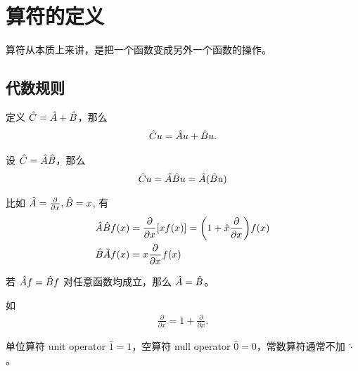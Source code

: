 
\section{算符的定义}
算符从本质上来讲，是把一个函数变成另外一个函数的操作。
\subsection{代数规则}

\begin{theorem}[算符的和与差]
    定义 $\hat C = \hat A + \hat B$，那么
\begin{eqnarray}
    \hat C u = \hat A u + \hat B u. 
\end{eqnarray}
\end{theorem}

\begin{theorem}[算符的乘法]
    设 $\hat C = \hat A \hat B$，那么
\begin{eqnarray}
    \hat C u = \hat A\hat B u = \hat A (\hat B u)
\end{eqnarray}
\end{theorem}


比如 $\hat A = \frac{\partial}{\partial x}, \hat B=x$, 有
\begin{align}
    \hat A \hat B f(x) &= \pdv{x} [x f(x)] = \qty(1 + \hat x \pdv{x}) f(x) \\
    \hat B \hat A f(x) &= x \pdv{x} f(x)
\end{align}

\begin{theorem}[等价算符]
    若 $\hat A f=\hat B f$ 对任意函数均成立，那么 $\hat A =\hat B$。
\end{theorem}
如
\begin{eqnarray}
    \frac{\partial}{\partial x} = 1 + \frac{\partial}{\partial x}.
\end{eqnarray}

\begin{theorem}[基本算符]
    单位算符 unit operator $\hat 1 = 1$，空算符 null operator $\hat 0 = 0$，常数算符通常不加 $\hat\cdot$。
\end{theorem}

